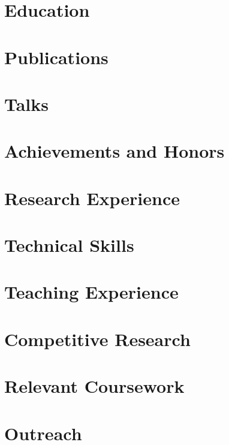 \documentclass[letterpaper,11pt]{article}
\begin{document}


\vspace{1.5em}
\section{Education}
\vspace{0.5em}


\vspace{-0.5em}
\section{Publications}


\section{Talks}


\section{Achievements and Honors}
\vspace{0.5em}


\vspace{0.8em}
\section{Research Experience}
\vspace{0.5em}
\justifying

\raggedright

\section{Technical Skills}


\section{Teaching Experience}
\vspace{0.3em}


\section{Competitive Research}


\section{Relevant Coursework}


\section{Outreach}


\thispagestyle{empty}
\end{document}
